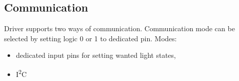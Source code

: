 \subsection{Communication}
Driver supports two ways of communication. Communication mode can be selected by setting logic 0 or 1 to dedicated pin.
\newline
Modes:
\begin{itemize}
	\item dedicated input pins for setting wanted light states,
	\item I\textsuperscript{2}C
\end{itemize}
